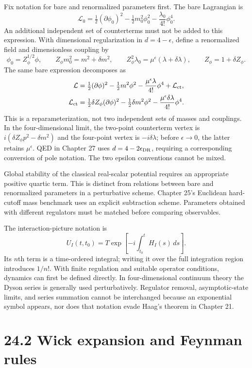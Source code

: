 \documentclass[
  11pt,
  oneside]{book}
\begin{document}
Fix notation for bare and renormalized parameters first. The bare
Lagrangian is \[
\mathcal L_0=\tfrac12(\partial\phi_0)^2
-\tfrac12m_0^2\phi_0^2-\frac{\lambda_0}{4!}\phi_0^4.
\] An additional independent set of counterterms must not be added to
this expression. With dimensional regularization in \(d=4-\epsilon\),
define a renormalized field and dimensionless coupling by \[
\phi_0=Z_\phi^{1/2}\phi,\qquad
Z_\phi m_0^2=m^2+\delta m^2,\qquad
Z_\phi^2\lambda_0=\mu^\epsilon(\lambda+\delta\lambda),
\qquad Z_\phi=1+\delta Z_\phi.
\] The same bare expression decomposes as \[
\begin{aligned}
\mathcal L={}&\tfrac12(\partial\phi)^2-\tfrac12m^2\phi^2
-\frac{\mu^\epsilon\lambda}{4!}\phi^4+\mathcal L_{\rm ct},\\
\mathcal L_{\rm ct}={}&\tfrac12\delta Z_\phi(\partial\phi)^2
-\tfrac12\delta m^2\phi^2-\frac{\mu^\epsilon\delta\lambda}{4!}\phi^4.
\end{aligned}
\] This is a reparameterization, not two independent sets of masses and
couplings. In the four-dimensional limit, the two-point counterterm
vertex is \(i(\delta Z_\phi p^2-\delta m^2)\) and the four-point vertex
is \(-i\delta\lambda\); before \(\epsilon\to0\), the latter retains
\(\mu^\epsilon\). QED in Chapter 27 uses \(d=4-2\epsilon_{\rm DR}\),
requiring a corresponding conversion of pole notation. The two epsilon
conventions cannot be mixed.

Global stability of the classical real-scalar potential requires an
appropriate positive quartic term. This is distinct from relations
between bare and renormalized parameters in a perturbative scheme.
Chapter 25's Euclidean hard-cutoff mass benchmark uses an explicit
subtraction scheme. Parameters obtained with different regulators must
be matched before comparing observables.

The interaction-picture notation is \[
U_I(t,t_0)=T\exp\left[-i\int_{t_0}^{t}H_I(s)\,ds\right].
\] Its \(n\)th term is a time-ordered integral; writing it over the full
integration region introduces \(1/n!\). With finite regulation and
suitable operator conditions, dynamics can first be defined directly. In
four-dimensional continuum theory the Dyson series is generally used
perturbatively. Regulator removal, asymptotic-state limits, and series
summation cannot be interchanged because an exponential symbol appears,
nor does that notation evade Haag's theorem in Chapter 21.

\section{24.2 Wick expansion and Feynman rules}
\end{document}
